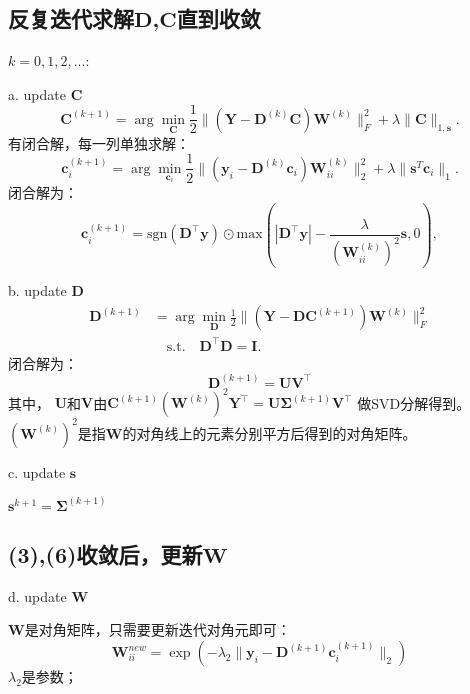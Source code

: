 \documentclass[10pt,twocolumn,letterpaper]{article}
\begin{document}
\subsection{反复迭代求解$\mathbf{D}$,$\mathbf{C}$直到收敛}
$k=0,1,2,...$:

a. update $\mathbf{C}$
\begin{equation}
\mathbf{C}^{(k+1)}
=
\arg\min_{\mathbf{C}}\frac{1}{2}\|(\mathbf{Y}-\mathbf{D}^{(k)}\mathbf{C})\mathbf{W}^{(k)}\|_{F}^{2}
+
\lambda\|\mathbf{C}\|_{1,\mathbf{s}}.
\end{equation}
有闭合解，每一列单独求解：
\begin{equation}
\mathbf{c}_{i}^{(k+1)}
=
\arg\min_{\mathbf{c}_{i}}\frac{1}{2}\|(\mathbf{y}_{i}-\mathbf{D}^{(k)}\mathbf{c}_{i})\mathbf{W}_{ii}^{(k)}\|_{2}^{2}
+
\lambda\|\mathbf{s}^{T}\mathbf{c}_{i}\|_{1}.
\end{equation}
闭合解为：
\begin{equation}
\mathbf{c}_{i}^{(k+1)} 
=
\text{sgn}(\mathbf{D^{\top}y}) 
\odot 
\text{max}(|\mathbf{D^{\top}y}|-\frac{\lambda}{(\mathbf{W}_{ii}^{(k)})^{2}}\mathbf{s},0),
\end{equation}

b. update $\mathbf{D}$
\begin{equation}
\begin{split}
\mathbf{D}^{(k+1)}
&
=
\arg\min_{\mathbf{D}}\frac{1}{2}\|(\mathbf{Y}-\mathbf{D}\mathbf{C}^{(k+1)})\mathbf{W}^{(k)}\|_{F}^{2}
\\
&
\quad
\text{s.t.}
\quad
\mathbf{D}^{\top}\mathbf{D} =\mathbf{I}. 
\end{split}
\end{equation}
闭合解为：
\begin{equation}
\mathbf{D}^{(k+1)}
=
\mathbf{U}\mathbf{V}^{\top}
\end{equation}
其中，
$\mathbf{U}$和$\mathbf{V}$由$\mathbf{C}^{(k+1)}(\mathbf{W}^{(k)})^{2}\mathbf{Y}^{\top}=\mathbf{U}\mathbf{\Sigma}^{(k+1)}\mathbf{V}^{\top}
$
做SVD分解得到。$(\mathbf{W}^{(k)})^{2}$是指$\mathbf{W}$的对角线上的元素分别平方后得到的对角矩阵。

c. update $\mathbf{s}$

$\mathbf{s}^{k+1}=\mathbf{\Sigma}^{(k+1)}$

\subsection{(3),(6)收敛后，更新$\mathbf{W}$}
d. update $\mathbf{W}$

$\mathbf{W}$是对角矩阵，只需要更新迭代对角元即可：
\begin{equation}
\mathbf{W}_{ii}^{new}=\exp(-\lambda_{2}\|\mathbf{y}_{i}-\mathbf{D}^{(k+1)}\mathbf{c}_{i}^{(k+1)}\|_{2})
\end{equation}
$\lambda_{2}$是参数；
\end{document}
